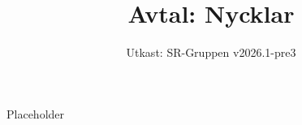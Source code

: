 \documentclass[a4paper]{dtek}
\title{Avtal: Nycklar}
\date{Utkast: SR-Gruppen v2026.1-pre3}
\begin{document}
Placeholder
\end{document}
